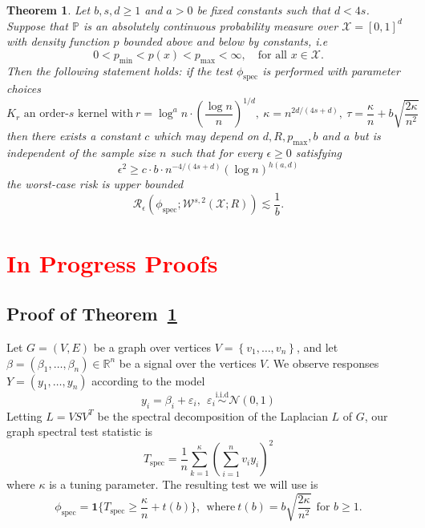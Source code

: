 \documentclass{article}
\newcommand{\Reals}{\mathbb{R}}
\newcommand{\set}[1]{\left\{#1\right\}}
\newcommand{\1}{\mathbf{1}}
\newcommand{\Pbb}{\mathbb{P}}
\newcommand{\spec}{\mathrm{spec}}
\theoremstyle{alden}
\theoremstyle{aldenthm}
\newtheorem{theorem}{Theorem}
\theoremstyle{definition}
\theoremstyle{remark}
\begin{document}
\begin{theorem}
	\label{thm:higher_order_sobolev_testing_rate}
	Let $b,s,d \geq 1$ and $a > 0$ be fixed constants such that $d < 4s$. Suppose that $\Pbb$ is an absolutely continuous probability measure over $\mathcal{X} = [0,1]^d$ with density function $p$ bounded above and below by constants, i.e
	\begin{equation*}
	0 < p_{\min} < p(x) < p_{\max} < \infty, \quad \textrm{for all $x \in \mathcal{X}$.}
	\end{equation*}
	Then the following statement holds: if the test $\phi_{\spec}$ is performed with parameter choices 
	\begin{equation*}
	\textrm{$K_r$ an order-$s$ kernel with}~ r = \log^a n \cdot \left(\frac{\log n}{n}\right)^{1/d}, ~\kappa = n^{2d/(4s + d)}, ~\tau = \frac{\kappa}{n} + b\sqrt{\frac{2\kappa}{n^2}}
	\end{equation*}
	then there exists a constant $c$ which may depend on $d,R,p_{\max},b$ and $a$ but is independent of the sample size $n$ such that for every $\epsilon \geq 0$ satisfying
	\begin{equation}
	\label{eqn:higher_order_sobolev_testing_rate}
	\epsilon^2 \geq c \cdot b \cdot n^{-4/(4s + d)} (\log n)^{h(a,d)}
	\end{equation}
	the worst-case risk is upper bounded
	\begin{equation}
	\label{eqn:higher_order_sobolev_testing_rate_1}
	\mathcal{R}_{\epsilon}(\phi_{\mathrm{spec}}; \mathcal{W}^{s,2}(\mathcal{X};R)) \lesssim \frac{1}{b}.
	\end{equation}
\end{theorem}

\section{\textcolor{red}{In Progress Proofs}}

\subsection{Proof of Theorem~\ref{thm:higher_order_sobolev_testing_rate}}

Let $G = (V,E)$ be a graph over vertices $V = \set{v_1,\ldots,v_n}$, and let $\beta = (\beta_1,\ldots,\beta_n) \in \Reals^n$ be a signal over the vertices $V$. We observe responses $Y = (y_1,\ldots,y_n)$ according to the model
\begin{equation*}
y_i = \beta_i + \varepsilon_i, ~~ \varepsilon_i \overset{\textrm{i.i.d}}{\sim} \mathcal{N}(0,1)
\end{equation*}
Letting $L = VSV^T$ be the spectral decomposition of the Laplacian $L$ of $G$, our graph spectral test statistic is 
\begin{equation*}
T_{\spec} = \frac{1}{n}\sum_{k = 1}^{\kappa} \left(\sum_{i = 1}^{n} v_i y_i\right)^2
\end{equation*}
where $\kappa$ is a tuning parameter. The resulting test we will use is
\begin{equation*}
\phi_{\spec} = \1\{T_{\spec} \geq \frac{\kappa}{n} + t(b)\},~~\textrm{where}~ t(b) = b\sqrt{\frac{2\kappa}{n^2}}~~\textrm{for $b \geq 1$.}
\end{equation*}
\end{document}
